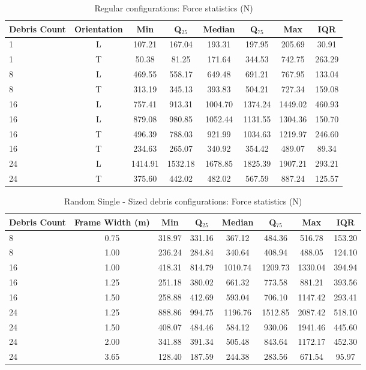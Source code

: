 \documentclass{article}
\begin{document}
\begin{table}[h!]
\centering
\caption{Regular configurations: Force statistics (N)}
\begin{tabular}{lccccccc}
\toprule
\textbf{Debris Count} & \textbf{Orientation} & \textbf{Min} & \textbf{Q$_{25}$} & \textbf{Median} & \textbf{Q$_{75}$} & \textbf{Max} & \textbf{IQR} \\
\midrule
1 & L & 107.21 & 167.04 & 193.31 & 197.95 & 205.69 & 30.91 \\
1 & T & 50.38 & 81.25 & 171.64 & 344.53 & 742.75 & 263.29 \\
8 & L & 469.55 & 558.17 & 649.48 & 691.21 & 767.95 & 133.04 \\
8 & T & 313.19 & 345.13 & 393.83 & 504.21 & 727.34 & 159.08 \\
16 & L & 757.41 & 913.31 & 1004.70 & 1374.24 & 1449.02 & 460.93 \\
16 & L & 879.08 & 980.85 & 1052.44 & 1131.55 & 1304.36 & 150.70 \\
16 & T & 496.39 & 788.03 & 921.99 & 1034.63 & 1219.97 & 246.60 \\
16 & T & 234.63 & 265.07 & 340.92 & 354.42 & 489.07 & 89.34 \\
24 & L & 1414.91 & 1532.18 & 1678.85 & 1825.39 & 1907.21 & 293.21 \\
24 & T & 375.60 & 442.02 & 482.02 & 567.59 & 887.24 & 125.57 \\
\bottomrule
\end{tabular}
\end{table}

\begin{table}[h!]
\centering
\caption{Random Single - Sized debris configurations: Force statistics (N)}
\begin{tabular}{lccccccc}
\toprule
\textbf{Debris Count} & \textbf{Frame Width (m)} & \textbf{Min} & \textbf{Q$_{25}$} & \textbf{Median} & \textbf{Q$_{75}$} & \textbf{Max} & \textbf{IQR} \\
\midrule
8 & 0.75 & 318.97 & 331.16 & 367.12 & 484.36 & 516.78 & 153.20 \\
8 & 1.00 & 236.24 & 284.84 & 340.64 & 408.94 & 488.05 & 124.10 \\
16 & 1.00 & 418.31 & 814.79 & 1010.74 & 1209.73 & 1330.04 & 394.94 \\
16 & 1.25 & 251.18 & 380.02 & 661.32 & 773.58 & 881.21 & 393.56 \\
16 & 1.50 & 258.88 & 412.69 & 593.04 & 706.10 & 1147.42 & 293.41 \\
24 & 1.25 & 888.86 & 994.75 & 1196.76 & 1512.85 & 2087.42 & 518.10 \\
24 & 1.50 & 408.07 & 484.46 & 584.12 & 930.06 & 1941.46 & 445.60 \\
24 & 2.00 & 341.88 & 391.34 & 505.48 & 843.64 & 1172.17 & 452.30 \\
24 & 3.65 & 128.40 & 187.59 & 244.38 & 283.56 & 671.54 & 95.97 \\
\bottomrule
\end{tabular}
\end{table}
\end{document}
